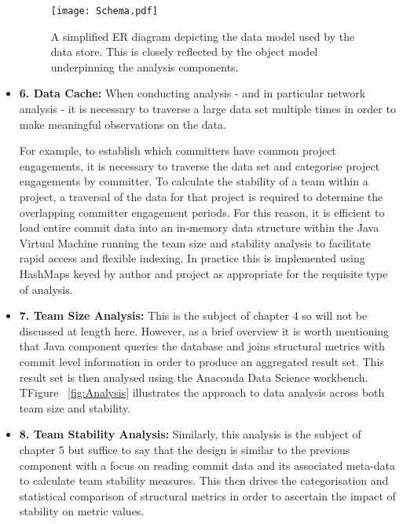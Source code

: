 \begin{itemize}
 \begin{figure}[htbp!] 
 \centering    
 \texttt{[image: Schema.pdf]}
 \caption[A simplified ER diagram depicting the logical data model used by the data store.]{A simplified ER diagram depicting the data model used by the data store. This is closely reflected by the object model underpinning the analysis components.}
 \label{fig:Schema}
 \end{figure}

\item \textbf{6. Data Cache:}
When conducting analysis - and in particular network analysis - it is necessary to traverse a large data set multiple times in order to make meaningful observations on the data.

For example, to establish which committers have common project engagements, it is necessary to traverse the data set and categorise project engagements by committer. To calculate the stability of a team within a project, a traversal of the data for that project is required to determine the overlapping committer engagement periods. For this reason, it is efficient to load entire commit data into an in-memory data structure within the Java Virtual Machine running the team size and stability analysis to facilitate rapid access and flexible indexing. In practice this is implemented using HashMaps keyed by author and project as appropriate for the requisite type of analysis. 

\item \textbf{7. Team Size Analysis:} This is the subject of chapter 4 so will not be discussed at length here. However, as a brief overview it is worth mentioning that Java component queries the database and joins structural metrics with commit level information in order to produce an aggregated result set. This result set is then analysed using the Anaconda Data Science workbench. TFigure ~\ref{fig:Analysis} illustrates the approach to data analysis across both team size and stability.

\item \textbf{8. Team Stability Analysis:} Similarly, this analysis is the subject of chapter 5 but suffice to say that the design is similar to the previous component with a focus on reading commit data and its associated meta-data to calculate team stability measures. This then drives the categorisation and statistical comparison of structural metrics in order to ascertain the impact of stability on metric values.
\end{itemize}


